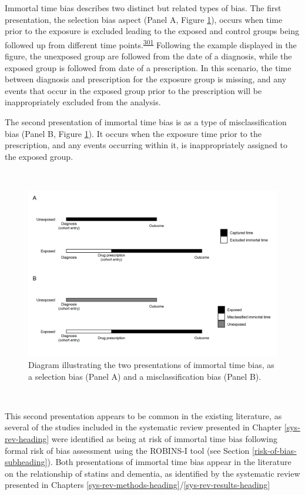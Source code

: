 \documentclass[a4paper, twoside]{templates/ociamthesis}
\begin{document}
Immortal time bias describes two distinct but related types of bias. The first presentation, the selection bias aspect (Panel A, Figure \ref{fig:immortalTimeBias}), occurs when time prior to the exposure is excluded leading to the exposed and control groups being followed up from different time points.\textsuperscript{\protect\hyperlink{ref-levesque2010}{301}} Following the example displayed in the figure, the unexposed group are followed from the date of a diagnosis, while the exposed group is followed from date of a prescription. In this scenario, the time between diagnosis and prescription for the exposure group is missing, and any events that occur in the exposed group prior to the prescription will be inappropriately excluded from the analysis.

The second presentation of immortal time bias is as a type of misclassification bias (Panel B, Figure \ref{fig:immortalTimeBias}). It occurs when the exposure time prior to the prescription, and any events occurring within it, is inappropriately assigned to the exposed group.

~





\begin{figure}[H]
\includegraphics[width=1\linewidth]{figures/cprd-analysis/immortal_time} \caption[shortcap]{Diagram illustrating the two presentations of immortal time bias, as a selection bias (Panel A) and a misclassification bias (Panel B).}\label{fig:immortalTimeBias}
\end{figure}

~

This second presentation appears to be common in the existing literature, as several of the studies included in the systematic review presented in Chapter \ref{sys-rev-heading} were identified as being at risk of immortal time bias following formal risk of bias assessment using the ROBINS-I tool (see Section \ref{risk-of-bias-subheading}). Both presentations of immortal time bias appear in the literature on the relationship of statins and dementia, as identified by the systematic review presented in Chapters \ref{sys-rev-methods-heading}/\ref{sys-rev-results-heading}
\end{document}
